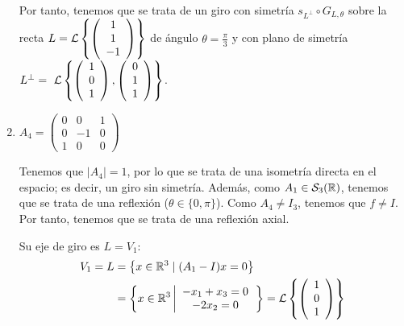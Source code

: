 \begin{ejercicio}
\begin{enumerate}
        Por tanto, tenemos que se trata de un giro con simetría $s_{L^\perp}\circ G_{L,\theta}$ sobre la recta $L=\mathcal{L}\left\{\left(\begin{array}{c}
                     1 \\ 1 \\ -1
                \end{array}\right)\right\}$ de ángulo $\theta=\frac{\pi}{3}$ y con plano de simetría $L^\perp=~\mathcal{L}\left\{\left(\begin{array}{c}
                     1 \\ 0 \\ 1
                \end{array}\right),
                \left(\begin{array}{c}
                     0 \\ 1 \\ 1
                \end{array}\right)\right\}$.




        \item $A_4=\left(\begin{array}{ccc}
            0 & 0 & 1 \\
            0 & -1 & 0 \\
            1 & 0 & 0
        \end{array}\right)$

        Tenemos que $|A_4|=1$, por lo que se trata de una isometría directa en el espacio; es decir, un giro sin simetría. Además, como $A_1\in \mathcal{S}_3(\mathbb{R})$, tenemos que se trata de una reflexión ($\theta \in \{0,\pi\}$). Como $A_4\neq I_3$, tenemos que $f\neq I$. Por tanto, tenemos que se trata de una reflexión axial.

        Su eje de giro es $L=V_1$:
        \begin{equation*}
            \begin{split}
                V_1=L& = \left\{x\in \mathbb{R}^3 \mid (A_1-I)x=0\right\}\\
                & = \left\{x\in \mathbb{R}^3 \left|
                \begin{array}{c}
                    -x_1+x_3=0 \\
                    -2x_2=0
                \end{array}
                \right.\right\}
                = \mathcal{L}\left\{\left(\begin{array}{c}
                     1 \\ 0 \\ 1
                \end{array}\right)\right\}
            \end{split}
        \end{equation*}


\end{enumerate}
\end{ejercicio}
